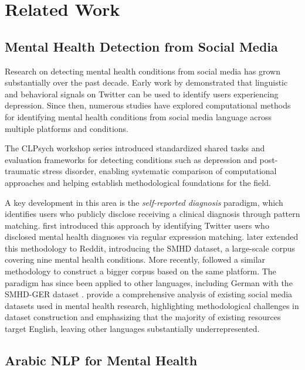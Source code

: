 \documentclass[11pt]{article}
\begin{document}
\section{Related Work}
\label{sec:related_work}

\subsection{Mental Health Detection from Social Media}
\label{subsec:related_social_media}
Research on detecting mental health conditions from social media has grown
substantially over the past decade. Early work by \citet{de2013predicting}
demonstrated that linguistic and behavioral signals on Twitter can be used to
identify users experiencing depression. Since then, numerous studies have explored
computational methods for identifying mental health conditions from social media
language across multiple platforms and conditions.

The CLPsych workshop series \cite{coppersmith2015clpsych} introduced standardized
shared tasks and evaluation frameworks for detecting conditions such as depression
and post-traumatic stress disorder, enabling systematic comparison of computational
approaches and helping establish methodological foundations for the field.

A key development in this area is the \textit{self-reported diagnosis} paradigm,
which identifies users who publicly disclose receiving a clinical diagnosis through
pattern matching. \citet{coppersmith2014quantifying} first introduced this approach
by identifying Twitter users who disclosed mental health diagnoses via regular
expression matching. \citet{cohan-etal-2018-smhd} later extended this methodology to
Reddit, introducing the SMHD dataset, a large-scale corpus covering nine mental
health conditions. More recently, \citet{mankarious2025mindset} followed a similar methodology to construct a bigger corpus based on the same platform. The paradigm has since been applied to other languages,
including German with the SMHD-GER dataset \cite{zanwar2023smhd}.
\citet{harrigian2021state} provide a comprehensive analysis of existing social
media datasets used in mental health research, highlighting methodological
challenges in dataset construction and emphasizing that the majority of existing
resources target English, leaving other languages substantially underrepresented.

\subsection{Arabic NLP for Mental Health}
\label{subsec:related_arabic}
\end{document}
